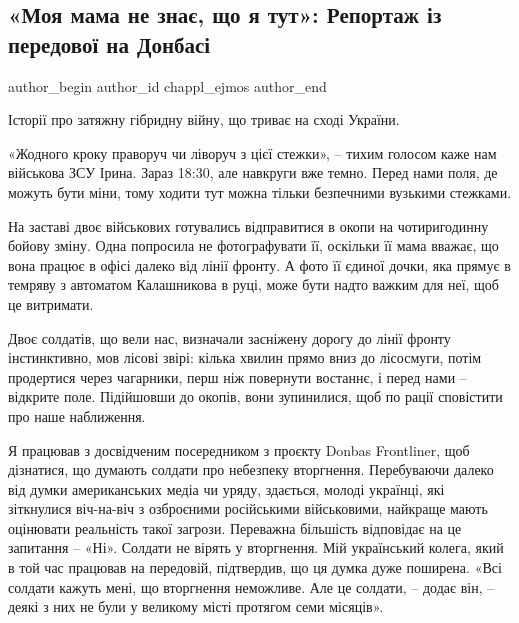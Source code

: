  
 
 
 
 
\subsection{«Моя мама не знає, що я тут»: Репортаж із передової на Донбасі}
\label{sec:14_12_2021.stz.news.ua.radiosvoboda.1.peredovaja}


\ifcmt
 author_begin
   author_id chappl_ejmos
 author_end
\fi


Історії про затяжну гібридну війну, що триває на сході України.

«Жодного кроку праворуч чи ліворуч з цієї стежки», – тихим голосом каже нам
військова ЗСУ Ірина. Зараз 18:30, але навкруги вже темно. Перед нами поля, де
можуть бути міни, тому ходити тут можна тільки безпечними вузькими стежками.

\begin{zznagolos}
На заставі двоє військових готувались відправитися в окопи на чотиригодинну
бойову зміну. Одна попросила не фотографувати її, оскільки її мама вважає, що
вона працює в офісі далеко від лінії фронту. А фото її єдиної дочки, яка прямує
в темряву з автоматом Калашникова в руці, може бути надто важким для неї, щоб
це витримати.	
\end{zznagolos}

Двоє солдатів, що вели нас, визначали засніжену дорогу до лінії фронту
інстинктивно, мов лісові звірі: кілька хвилин прямо вниз до лісосмуги, потім
продертися через чагарники, перш ніж повернути востаннє, і перед нами –
відкрите поле. Підійшовши до окопів, вони зупинилися, щоб по рації сповістити
про наше наближення.


Я працював з досвідченим посередником з проєкту Donbas Frontliner, щоб
дізнатися, що думають солдати про небезпеку вторгнення. Перебуваючи далеко від
думки американських медіа чи уряду, здається, молоді українці, які зіткнулися
віч-на-віч з озброєними російськими військовими, найкраще мають оцінювати
реальність такої загрози. Переважна більшість відповідає на це запитання –
«Ні». Солдати не вірять у вторгнення. Мій український колега, який в той час
працював на передовій, підтвердив, що ця думка дуже поширена. «Всі солдати
кажуть мені, що вторгнення неможливе. Але це солдати, – додає він, – деякі з
них не були у великому місті протягом семи місяців».

